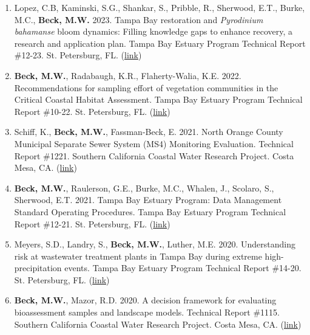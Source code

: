 \documentclass[letterpaper,12pt]{article}
\begin{document}
\begin{enumerate}

\item Lopez, C.B, Kaminski, S.G., Shankar, S., Pribble, R., Sherwood, E.T., Burke, M.C., \textbf{Beck, M.W.} 2023. Tampa Bay restoration and \textit{Pyrodinium bahamanse} bloom dynamics: Filling knowledge gaps to enhance recovery, a research and application plan. Tampa Bay Estuary Program Technical Report \#12-23. St. Petersburg, FL. ({\footnotesize\href{https://drive.google.com/file/d/140oBnV5R2BwOZ7cMuaY-4bu_ftL-YBVJ/view?usp=sharing}{link}})

\item \textbf{Beck, M.W.}, Radabaugh, K.R., Flaherty-Walia, K.E. 2022. Recommendations for sampling effort of vegetation communities in the Critical Coastal Habitat Assessment. Tampa Bay Estuary Program Technical Report \#10-22. St. Petersburg, FL. ({\footnotesize\href{https://drive.google.com/file/d/1FAQFdw5oXunCQe-wGrwvnnOGTqaIHdFE/view?usp=sharing}{link}})

\item Schiff, K., \textbf{Beck, M.W.}, Fassman-Beck, E. 2021. North Orange County Municipal Separate Sewer System (MS4) Monitoring Evaluation. Technical Report \#1221. Southern California Coastal Water Research Project. Costa Mesa, CA. ({\footnotesize\href{https://ftp.sccwrp.org/pub/download/DOCUMENTS/TechnicalReports/1221_OCMonitoringEvaluation.pdf}{link}})

\item \textbf{Beck, M.W.}, Raulerson, G.E., Burke, M.C., Whalen, J., Scolaro, S., Sherwood, E.T. 2021. Tampa Bay Estuary Program: Data Management Standard Operating Procedures. Tampa Bay Estuary Program Technical Report \#12-21. St. Petersburg, FL. ({\footnotesize\href{https://drive.google.com/file/d/1vO4B8DJATgCSV1qOxZz-kN6Uj1BrgNsg/view?usp=sharing}{link}})

\item Meyers, S.D., Landry, S., \textbf{Beck, M.W.}, Luther, M.E. 2020. Understanding risk at wastewater treatment plants in Tampa Bay during extreme high-precipitation events. Tampa Bay Estuary Program Technical Report \#14-20. St. Petersburg, FL. ({\footnotesize\href{https://drive.google.com/file/d/1JTujiT7f7WUTF5r7__QqHwfq1oGmKj-s/view}{link}})

\item \textbf{Beck, M.W.}, Mazor, R.D. 2020. A decision framework for evaluating bioassessment samples and landscape models. Technical Report \#1115. Southern California Coastal Water Research Project. Costa Mesa, CA. ({\footnotesize\href{http://ftp.sccwrp.org/pub/download/DOCUMENTS/TechnicalReports/1115_CSCIDecisionFramework.pdf}{link}})


\end{enumerate}
\end{document}
